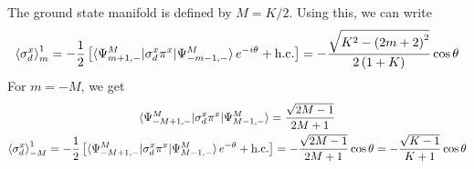 \documentclass[12pt]{revtex4-2}
\begin{document}
The ground state manifold is defined by \(M = K/2\). Using this, we can write
\begin{equation}\begin{aligned}
	\left<\sigma^x_d\right>_m^1 = -\frac{1}{2}\left[\braket{\Psi^M_{m+1,-}|\sigma_d^x \pi^x | \Psi^M_{-m-1,-}}e^{-i\theta} + \text{h.c.}\right] = -\frac{\sqrt{K^2 - \left(2m+2\right)^2}}{2\left(1+K\right)}\cos\theta
	\label{mag_x}
\end{aligned}\end{equation}
For \(m = -M\), we get
\begin{gather}
	\braket{\Psi^M_{-M+1,-}|\sigma_d^x \pi^x | \Psi^M_{M - 1,-}} = \frac{\sqrt{2M-1}}{2M + 1}\\
	\left<\sigma^x_d\right>_{-M}^1 = -\frac{1}{2}\left[\braket{\Psi^M_{-M+1,-}|\sigma_d^x \pi^x | \Psi^M_{M - 1,-}}e^{-\theta} + \text{h.c.}\right] = -\frac{\sqrt{2M-1}}{2M + 1}\cos\theta = -\frac{\sqrt{K-1}}{K+1}\cos\theta
\end{gather}
\end{document}

